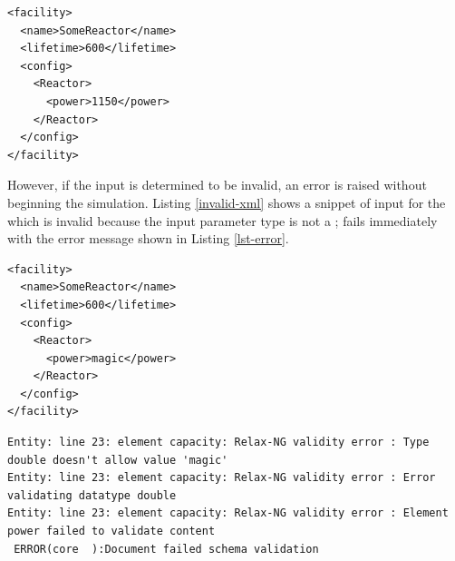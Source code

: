 \lstset{language=XML}
\begin{lstlisting}[caption={A Valid Input Snippet for the Simple Reactor}, 
                   label=valid-xml]
<facility>
  <name>SomeReactor</name>
  <lifetime>600</lifetime>
  <config>
    <Reactor>
      <power>1150</power>
    </Reactor>
  </config>
</facility>
\end{lstlisting}

However, if the input is determined to be invalid, an error is raised without
beginning the simulation. Listing \ref{invalid-xml} shows a snippet of input for
the  which is invalid because the  input parameter
type is not a ; \Cyclus fails immediately with the error message
shown in Listing \ref{lst-error}.

\lstset{language=XML}
\begin{lstlisting}[caption={An Invalid Input Snippet for the Simple Reactor}, 
                   label=invalid-xml]
<facility>
  <name>SomeReactor</name>
  <lifetime>600</lifetime>
  <config>
    <Reactor>
      <power>magic</power>
    </Reactor>
  </config>
</facility>
\end{lstlisting}

\lstset{language=bash}
\begin{lstlisting}[caption={A \Cyclus Error Message from the Invalid 
      Input in Listing \ref{invalid-xml}}, 
                   label=lst-error]
Entity: line 23: element capacity: Relax-NG validity error : Type double doesn't allow value 'magic'
Entity: line 23: element capacity: Relax-NG validity error : Error validating datatype double
Entity: line 23: element capacity: Relax-NG validity error : Element power failed to validate content
 ERROR(core  ):Document failed schema validation
\end{lstlisting}

